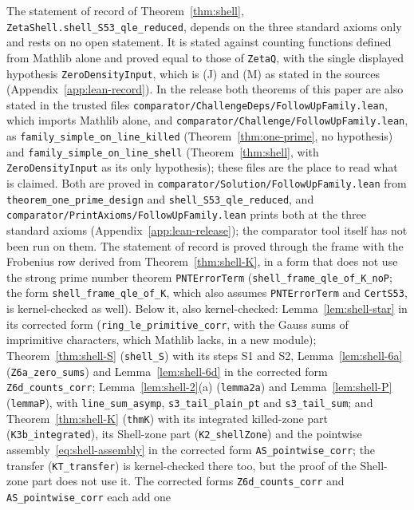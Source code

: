 \begin{enumerate}[label=(\alph*)]
The statement of record of Theorem~\ref{thm:shell}, \texttt{ZetaShell.shell\_S53\_qle\_reduced}, depends on the three standard axioms only and rests
on no open statement. It is stated against counting functions defined from Mathlib alone and proved equal to those of \texttt{ZetaQ}, with the single
displayed hypothesis \texttt{ZeroDensityInput}, which is (J) and (M) as stated in the sources (Appendix~\ref{app:lean-record}). In the release both
theorems of this paper are also stated in the trusted files \texttt{comparator/ChallengeDeps/FollowUpFamily.lean}, which imports Mathlib alone, and
\texttt{comparator/Challenge/FollowUpFamily.lean}, as \texttt{family\_simple\_on\_line\_killed} (Theorem~\ref{thm:one-prime}, no hypothesis) and
\texttt{family\_simple\_on\_line\_shell} (Theorem~\ref{thm:shell}, with \texttt{ZeroDensityInput} as its only hypothesis); these files are the place to
read what is claimed. Both are proved in \texttt{comparator/Solution/FollowUpFamily.lean} from \texttt{theorem\_one\_prime\_design} and
\texttt{shell\_S53\_qle\_reduced}, and \texttt{comparator/PrintAxioms/FollowUpFamily.lean} prints both at the three standard axioms
(Appendix~\ref{app:lean-release}); the comparator tool itself has not been run on them. The statement of record is proved through the frame with the
Frobenius row derived from Theorem~\ref{thm:shell-K}, in a form that does not use the strong prime number theorem \texttt{PNTErrorTerm}
(\texttt{shell\_frame\_qle\_of\_K\_noP}; the form \texttt{shell\_frame\_qle\_of\_K}, which also assumes \texttt{PNTErrorTerm} and \texttt{CertS53}, is
kernel-checked as well). Below it, also kernel-checked: Lemma~\ref{lem:shell-star} in its corrected form
(\texttt{ring\_le\_primitive\_corr}, with the Gauss sums of imprimitive characters, which Mathlib lacks, in a new module); Theorem~\ref{thm:shell-S}
(\texttt{shell\_S}) with its steps S1 and S2, Lemma~\ref{lem:shell-6a} (\texttt{Z6a\_zero\_sums}) and Lemma~\ref{lem:shell-6d} in the corrected form
\texttt{Z6d\_counts\_corr}; Lemma~\ref{lem:shell-2}(a) (\texttt{lemma2a}) and Lemma~\ref{lem:shell-P} (\texttt{lemmaP}), with \texttt{line\_sum\_asymp},
\texttt{s3\_tail\_plain\_pt} and \texttt{s3\_tail\_sum}; and Theorem~\ref{thm:shell-K} (\texttt{thmK}) with its integrated killed-zone part
(\texttt{K3b\_integrated}), its Shell-zone part (\texttt{K2\_shellZone}) and the pointwise
assembly~\eqref{eq:shell-assembly} in the corrected form \texttt{AS\_pointwise\_corr}; the transfer (\texttt{KT\_transfer}) is kernel-checked there too,
but the proof of the Shell-zone part does not use it. The corrected forms \texttt{Z6d\_counts\_corr} and \texttt{AS\_pointwise\_corr} each add one

\end{enumerate}
